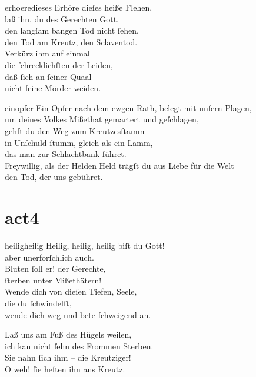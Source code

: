 \documentclass[abbrwidth=6em,tocstyle=ref-genre,toe=false]{ees}
\begin{document}
{\begin{movement}{erhoeredieses}
  Erhöre dieſes heiße Flehen,\\
  laß ihn, du des Gerechten Gott,\\
  den langſam bangen Tod nicht ſehen,\\
  den Tod am Kreutz, den Sclaventod.\\
  Verkürz ihm auf einmal\\
  die ſchrecklichſten der Leiden,\\
  daß ſich an ſeiner Quaal\\
  nicht ſeine Mörder weiden.
\end{movement}

\begin{movement}{einopfer}
  \voice[Chor]
  Ein Opfer nach dem ewgen Rath, belegt mit unſern Plagen,\\
  um deines Volkes Mißethat gemartert und geſchlagen,\\
  gehſt du den Weg zum Kreutzesſtamm\\
  in Unſchuld ſtumm, gleich als ein Lamm,\\
  das man zur Schlachtbank führet.\\
  Freywillig, als der Helden Held trägſt du aus Liebe für die Welt\\
  den Tod, der uns gebühret.
\end{movement}

\part{act4}

\begin{movement}{heiligheilig}
  \voice[Nikodemus]
  Heilig, heilig, heilig biſt du Gott!\\
  aber unerforſchlich auch.\\
  Bluten ſoll er! der Gerechte,\\
  ſterben unter Mißethätern!\\
  Wende dich von dieſen Tiefen, Seele,\\
  die du ſchwindelſt,\\
  wende dich weg und bete ſchweigend an.

  \voice[Joseph]
  Laß uns am Fuß des Hügels weilen,\\
  ich kan nicht ſehn des Frommen Sterben.\\
  Sie nahn ſich ihm – die Kreutziger!\\
  O weh! ſie heften ihn ans Kreutz.
\end{movement}

}
\end{document}
